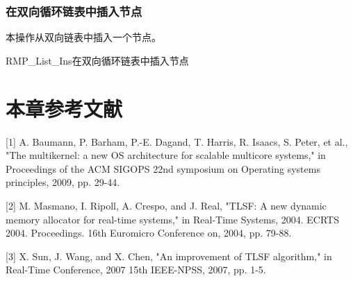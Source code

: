 \subsubsection{在双向循环链表中插入节点}\label{subsubsec:insert-a-node-into-a-doubly-linked-circular-list}

本操作从双向链表中插入一个节点。

\begin{apidesc}{RMP\_List\_Ins}{在双向循环链表中插入节点}
    \begin{apiparams}
    \end{apiparams}
    \begin{apiret}
    \end{apiret}
\end{apidesc}

\section{本章参考文献}\label{sec:chapter-bibliography-3}

\protect{}\label{sec:chapter-bibliography-4}{[}1{]}
A. Baumann, P. Barham, P.-E. Dagand, T. Harris, R. Isaacs, S. Peter, et
al., "The multikernel: a new OS architecture for scalable multicore
systems," in Proceedings of the ACM SIGOPS 22nd symposium on Operating
systems principles, 2009, pp. 29-44.

{[}2{]} M. Masmano, I. Ripoll, A. Crespo, and J. Real, "TLSF: A new
dynamic memory allocator for real-time systems," in Real-Time Systems,
2004. ECRTS 2004. Proceedings. 16th Euromicro Conference on, 2004, pp.
79-88.

{[}3{]} X. Sun, J. Wang, and X. Chen, "An improvement of TLSF
algorithm," in Real-Time Conference, 2007 15th IEEE-NPSS, 2007, pp. 1-5.
